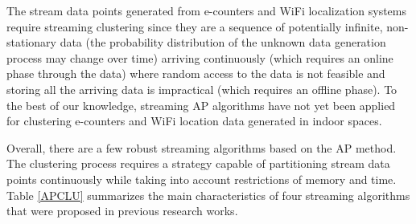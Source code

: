 The stream data points generated from e-counters and WiFi localization systems require streaming clustering since they are a sequence of potentially infinite, non-stationary data (the probability distribution of the unknown data generation process may change over time) arriving continuously (which requires an online phase through the data) where random access to the data is not feasible and storing all the arriving data is impractical (which requires an offline phase). To  the  best  of  our  knowledge,  streaming AP algorithms have  not  yet  been  applied for clustering e-counters and WiFi location data generated in indoor spaces. 








Overall, there are a few robust streaming algorithms based on the AP method. The clustering process requires a strategy capable of partitioning stream data points continuously while taking into account restrictions of memory and time. Table \ref{APCLU} summarizes the main characteristics of four streaming algorithms that were proposed in previous research works. 



